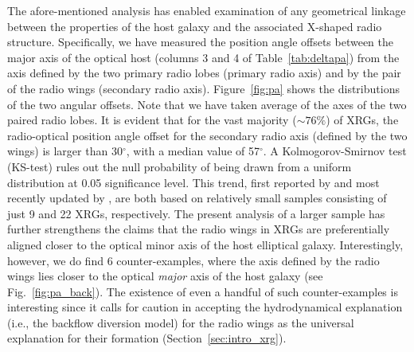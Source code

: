 \documentclass[twocolumn]{aastex62}
\begin{document}
The afore-mentioned analysis has enabled examination of any
geometrical linkage between the properties of the host galaxy and the
associated X-shaped radio structure. Specifically, we have measured
the position angle offsets between the major axis of the optical host
(columns 3 and 4 of Table~\ref{tab:deltapa}) from the axis defined by
the two primary radio lobes (primary radio axis) and by the pair of
the radio wings (secondary radio axis). Figure~\ref{fig:pa} shows the
distributions of the two angular offsets. Note that we have taken
average of the axes of the two paired radio lobes. It is evident that
for the vast majority ($\sim 76\%$) of XRGs, the radio-optical
position angle offset for the secondary radio axis (defined by the two
wings) is larger than 30$^{\circ}$, with a median value of
57$^{\circ}$.  A Kolmogorov-Smirnov test (KS-test) rules out the
  null probability of being drawn from a uniform distribution at 
0.05  significance level. This trend, first reported by
\citet{Capetti2002A&A...394...39C} and most recently updated by
\citet{Gillone2016A&A...587A..25G}, are both based on relatively small
samples consisting of just 9 and 22 XRGs, respectively. The present
analysis of a larger sample has further strengthens the claims that
the radio wings in XRGs are preferentially aligned closer to the
optical minor axis of the host elliptical galaxy. Interestingly,
however, we do find 6 counter-examples, where the axis defined by the
radio wings lies closer to the optical {\it major} axis of the host
galaxy (see Fig.~\ref{fig:pa_back}). The existence of even a handful
of such counter-examples is interesting since it calls for caution in
accepting the hydrodynamical explanation (i.e., the backflow diversion
model) for the radio wings as the universal explanation for their
formation (Section~\ref{sec:intro_xrg}).
\end{document}
